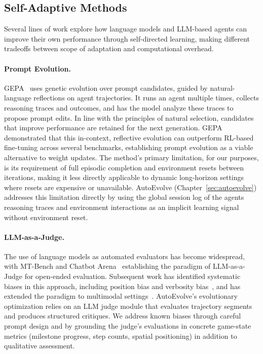 \subsection{Self-Adaptive Methods}\label{sec:self_adaptation}

Several lines of work explore how language models and LLM-based agents can improve their own performance through self-directed learning, making different tradeoffs between scope of adaptation and computational overhead.

\paragraph{Prompt Evolution.} GEPA~\citep{agrawal2025gepa} uses genetic evolution over prompt candidates, guided by natural-language reflections on agent trajectories. It runs an agent multiple times, collects reasoning traces and outcomes, and has the model analyze these traces to propose prompt edits. In line with the principles of natural selection, candidates that improve performance are retained for the next generation. GEPA demonstrated that this in-context, reflective evolution can outperform RL-based fine-tuning across several benchmarks, establishing prompt evolution as a viable alternative to weight updates. The method's primary limitation, for our purposes, is its requirement of full episodic completion and environment resets between iterations, making it less directly applicable to dynamic long-horizon settings where resets are expensive or unavailable. AutoEvolve (Chapter~\ref{sec:autoevolve}) addresses this limitation directly by using the global session log of the agents reasoning traces and environment interactions as an implicit learning signal without environment reset.

\paragraph{LLM-as-a-Judge.} The use of language models as automated evaluators has become widespread, with MT-Bench and Chatbot Arena~\citep{zheng2023mtbench} establishing the paradigm of LLM-as-a-Judge for open-ended evaluation. Subsequent work has identified systematic biases in this approach, including position bias and verbosity bias~\citep{shi2024judgingthejudges}, and has extended the paradigm to multimodal settings~\citep{chen2024mllmjudge}. AutoEvolve's evolutionary optimization relies on an LLM judge module that evaluates trajectory segments and produces structured critiques. We address known biases through careful prompt design and by grounding the judge's evaluations in concrete game-state metrics (milestone progress, step counts, spatial positioning) in addition to qualitative assessment.
